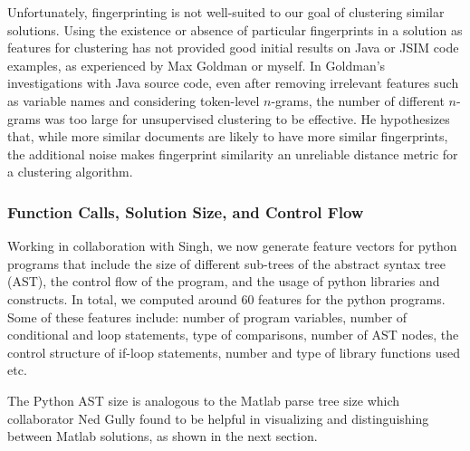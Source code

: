 \documentclass[12pt]{article}
\begin{document}
Unfortunately, fingerprinting is not well-suited to our goal of clustering similar solutions. Using the existence or absence of particular fingerprints in a solution as features for clustering has not provided good initial results on Java or JSIM code examples, as experienced by Max Goldman or myself. In Goldman's investigations with Java source code, even after removing irrelevant features such as variable names and considering token-level $n$-grams, the number of different $n$-grams was too large for unsupervised clustering to be effective. He hypothesizes that, while more similar documents are likely to have more similar fingerprints, the additional noise makes fingerprint similarity an unreliable distance metric for a clustering algorithm.



\subsubsection{Function Calls, Solution Size, and Control Flow}

Working in collaboration with Singh, we now generate feature vectors for python programs that include the size of different sub-trees of the abstract syntax tree (AST), the control flow of the program, and the usage of python libraries and constructs. In total, we computed around $60$ features for the python programs. Some of these features include: number of program variables, number of conditional and loop statements, type of comparisons, number of AST nodes, the control structure of if-loop statements, number and type of library functions used etc.

The Python AST size is analogous to the Matlab parse tree size which collaborator Ned Gully found to be helpful in visualizing and distinguishing between Matlab solutions, as shown in the next section.
\end{document}
